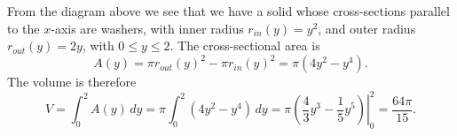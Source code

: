 \documentclass[12pt]{article}
\begin{document}
\begin{enumerate}
\begin{enumerate}
From the diagram above we see that we have a solid whose cross-sections parallel to the $x$-axis are washers, with inner radius $r_{in}(y)=y^2$, and outer radius $r_{out}(y)=2y$, with $0\leq y\leq 2$. The cross-sectional area is
\[
 A(y) = \pi r_{out}(y)^2-\pi r_{in}(y)^2 = \pi (4y^2-y^4).
\]
The volume is therefore
\[
 V = \int_0^2A(y)\,dy = \pi \int_0^2 (4y^2-y^4)\,dy = \pi\left.\left(\frac{4}{3}y^3-\frac{1}{5}y^5\right)\right|_0^2 = \frac{64\pi}{15}.
\]


\end{enumerate}

\end{enumerate}
\end{document}
